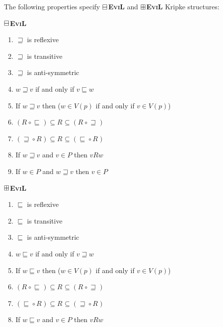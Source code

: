 \begin{definition}The following properties specify 
\textbf{$\boxminus$\textsc{EviL}} and \textbf{$\boxplus$\textsc{EviL}} Kripke structures:

\begin{minipage}[b]{0.5\linewidth}
\begin{center}
\textbf{$\boxminus$\textsc{EviL}}
\end{center}
  \begin{enumerate}[label=\textup{(\emph{\Roman*})$^\BM$}, topsep=0.0in, parsep=0.075in]
    \item \label{MpI} $\sqsupseteq$ is reflexive
    \item \label{Mptrans} $\sqsupseteq$ is transitive 
    \item \label{Mpantisym} $\sqsupseteq$ is anti-symmetric
    \item \label{Mpreverse} $w \sqsupseteq v$ if and only if $v
    \sqsubseteq w$
   \item \label{Mislandiff} If $w \sqsupseteq v$ then ($w \in V (p)$ if and only if $v \in V (p)$)
     \item \label{MpV} $(R^{} \circ \sqsubseteq^{}) \subseteq
    R^{} \subseteq (R^{} \circ \sqsupseteq^{})$
     \item \label{MpVI} $(\sqsupseteq^{} \circ R^{}) \subseteq
R^{} \subseteq
(\sqsubseteq^{} \circ R^{})$
     \item\label{MpVII} 
If $w \sqsupseteq v$ and $v \in P$ then $v R w$

    \item\label{MpIX} If $w \in P$ and $w \sqsupseteq v$ then $v
     \in P$
  \end{enumerate}
\end{minipage}
\hspace{0.5cm}
\begin{minipage}[b]{0.5\linewidth}
\begin{center}
\textbf{$\boxplus$\textsc{EviL}}
\end{center}
  \begin{enumerate}[label=\textup{(\emph{\Roman*})$^\BP$}, topsep=0.0in, parsep=0.075in]
    \item \label{PpI} $\sqsubseteq$ is reflexive
    \item \label{Pptrans} $\sqsubseteq$ is transitive 
    \item \label{Ppantisym} $\sqsubseteq$ is anti-symmetric
    \item \label{Ppreverse} $w \sqsubseteq v$ if and only if $v \sqsupseteq w$
   \item \label{Pislandiff} If $w \sqsubseteq v$ then ($w \in V (p)$ if and only if $v \in V (p)$)
     \item \label{PpV}  $(R^{} \circ \sqsubseteq^{}) \subseteq
    R^{} \subseteq (R^{} \circ \sqsupseteq^{})$
     \item \label{PpVI} $(\sqsubseteq^{} \circ R^{}) \subseteq
 R^{} \subseteq (\sqsupseteq^{} \circ R^{})$
     \item\label{PpVII} If $w \sqsubseteq v$ and $v \in P$ then $v
       R w$


\end{enumerate}
\end{minipage}
\end{definition}
